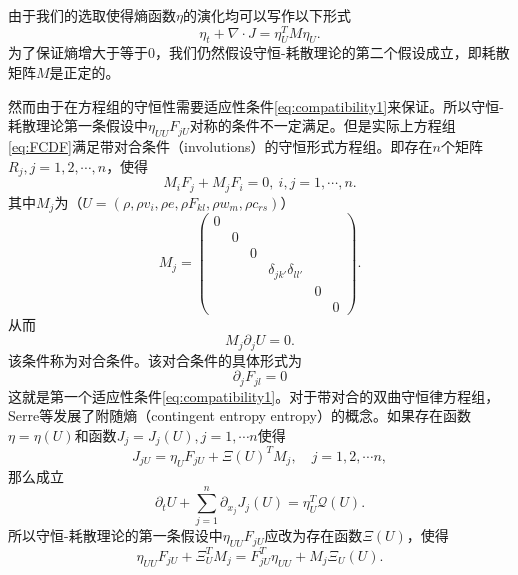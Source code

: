 \documentclass{article}
\begin{document}
由于我们的选取使得熵函数$\eta$的演化均可以写作以下形式
\begin{equation}\label{eq:entropypro}
	\eta_t + \nabla \cdot J = \eta_U^T M \eta_U.
\end{equation}
为了保证熵增大于等于$0$，我们仍然假设守恒-耗散理论的第二个假设成立，即耗散矩阵$M$是正定的。

然而由于在方程组的守恒性需要适应性条件\eqref{eq:compatibility1}来保证。所以守恒-耗散理论第一条假设中$\eta_{UU} F_{jU}$对称的条件不一定满足。但是实际上方程组\eqref{eq:FCDF}满足带对合条件（involutions）的守恒形式方程组\cite{dafermos1986quasilinear,dafermos2013non,benzoni2007multi}。即存在$n$个矩阵$R_j,j=1,2,\cdots,n$，使得
\begin{equation*}
	M_i F_{j} + M_j F_i = 0, \ i,j = 1, \cdots,n .
\end{equation*}
其中$M_j$为（$U= (\rho,\rho v_i,\rho e, \rho F_{kl},\rho w_m, \rho c_{rs})$）
\begin{equation*}
	M_{j} = \left( \begin{array}{ccccccc}
		0 \\
		& 0 \\
		& & 0 \\
		& & & \delta_{jk'}\delta_{ll'} \\
		& & & & 0 \\
		& & & & & 0
	\end{array} \right).
\end{equation*}
从而
\begin{equation}\label{eq:involutions}
	M_j \partial_j U = 0.
\end{equation}
该条件称为对合条件。该对合条件的具体形式为
\begin{equation*}
	\partial_{j} F_{jl} = 0
\end{equation*}
这就是第一个适应性条件\eqref{eq:compatibility1}。对于带对合的双曲守恒律方程组，Serre等发展了附随熵（contingent entropy entropy）的概念。如果存在函数$\eta = \eta(U)$和函数$J_j=J_j(U),j=1, \cdots n$使得
\begin{equation*}
	J_{jU}  = \eta_U F_{jU} + \Xi(U)^T M_j,\quad j=1,2, \cdots n,
\end{equation*}
那么成立
\begin{equation*}
	\partial_t U + \sum_{j=1}^n \partial_{x_j} J_{j}(U) = \eta_U^T \mathcal{Q}(U).
\end{equation*}
所以守恒-耗散理论的第一条假设中$\eta_{UU} F_{jU}$应改为存在函数$\Xi(U)$，使得
\begin{equation}\label{eq:invsym}
	\eta_{UU} F_{jU} + \Xi_U^T M_j = F_{jU}^T \eta_{UU} + M_j \Xi_U(U).
\end{equation}
\end{document}

